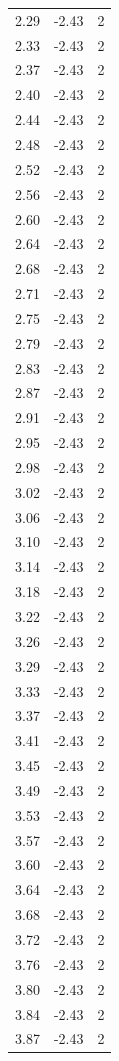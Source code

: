 \begin{longtable}{lrr}
  2.29 & -2.43 & 2 \\
  2.33 & -2.43 & 2 \\
  2.37 & -2.43 & 2 \\
  2.40 & -2.43 & 2 \\
  2.44 & -2.43 & 2 \\
  2.48 & -2.43 & 2 \\
  2.52 & -2.43 & 2 \\
  2.56 & -2.43 & 2 \\
  2.60 & -2.43 & 2 \\
  2.64 & -2.43 & 2 \\
  2.68 & -2.43 & 2 \\
  2.71 & -2.43 & 2 \\
  2.75 & -2.43 & 2 \\
  2.79 & -2.43 & 2 \\
  2.83 & -2.43 & 2 \\
  2.87 & -2.43 & 2 \\
  2.91 & -2.43 & 2 \\
  2.95 & -2.43 & 2 \\
  2.98 & -2.43 & 2 \\
  3.02 & -2.43 & 2 \\
  3.06 & -2.43 & 2 \\
  3.10 & -2.43 & 2 \\
  3.14 & -2.43 & 2 \\
  3.18 & -2.43 & 2 \\
  3.22 & -2.43 & 2 \\
  3.26 & -2.43 & 2 \\
  3.29 & -2.43 & 2 \\
  3.33 & -2.43 & 2 \\
  3.37 & -2.43 & 2 \\
  3.41 & -2.43 & 2 \\
  3.45 & -2.43 & 2 \\
  3.49 & -2.43 & 2 \\
  3.53 & -2.43 & 2 \\
  3.57 & -2.43 & 2 \\
  3.60 & -2.43 & 2 \\
  3.64 & -2.43 & 2 \\
  3.68 & -2.43 & 2 \\
  3.72 & -2.43 & 2 \\
  3.76 & -2.43 & 2 \\
  3.80 & -2.43 & 2 \\
  3.84 & -2.43 & 2 \\
  3.87 & -2.43 & 2 \\

\end{longtable}
